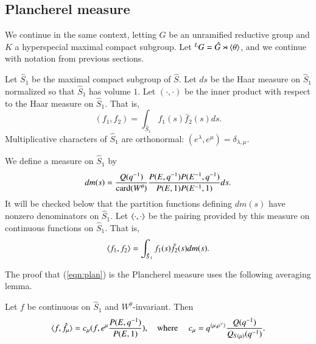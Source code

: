 \subsection{Plancherel measure}
We continue in the same context, letting $G$ be an unramified
reductive group and $K$ a hyperspecial maximal compact subgroup.  Let
${}^LG = \hat G\rtimes \langle{\theta}\rangle$, and we continue with notation
from previous sections.

Let ${\hat S}_1$ be the maximal compact subgroup of $\hat S$.  Let $ds$
be the Haar measure on $\hat S_1$ normalized so that $\hat S_1$ has
volume $1$.  Let $(\cdot,\cdot)$ be the inner product with respect to
the Haar measure on $\hat S_1$. That is,
\begin{equation}
(f_1,f_2) = \int_{\hat S_1} f_1(s) \bar f_2(s) ds.
\end{equation}
Multiplicative characters of $\hat S_1$ are orthonormal:
$(e^\lambda,e^\mu) = \delta_{\lambda,\mu}$.

We define a measure on $\hat S_1$ by
\begin{equation}\label{eqn:plan}
dm(s) = \frac{Q(q^{-1})}{{\operatorname{card}}(W^\theta)}
\frac{P(E,q^{-1}) P(E^{-1},q^{-1})}{P(E,1) P(E^{-1},1)} ds.
\end{equation}
It will be checked below that the partition functions defining $dm(s)$
have nonzero denominators on $\hat S_1$.  Let $\langle{\cdot,\cdot}\rangle$ be
the pairing provided by this measure on continuous functions on $\hat
S_1$.  That is,
\begin{equation}
\langle{f_1,f_2}\rangle = \int_{\hat S_1} f_1(s) \bar f_2(s) dm(s).
\end{equation}

The proof that (\ref{eqn:plan}) is the Plancherel measure uses the following averaging lemma.

\begin{lemma}\label{lemma:average} 
  Let $f$ be continuous on $\hat S_1$ and $W^\theta$-invariant.  Then
\[
\langle{f,\hat f_\mu}\rangle = c_\mu  (f, e^\mu\frac{ P(E,q^{-1})}{P(E,1)}),
\quad\text{where }\quad
c_\mu = q^{\langle{\mu,\rho^\vee}\rangle}\frac{ Q(q^{-1})}{Q_{S(\mu)}(q^{-1})}.
\]
\end{lemma}

